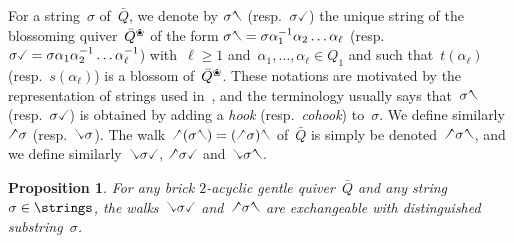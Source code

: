 \documentclass{amsart}
\newtheorem{proposition}[theorem]{Proposition}
\theoremstyle{definition}
\newcommand{\darkblue}{\color{darkblue}} %
\newcommand{\defn}[1]{\textsl{\darkblue #1}} %
\newcommand{\quiver}{\bar Q} %
\newcommand{\blossom}{^\text{\ding{96}}} %
\newcommand{\hL}{\text{\rotatebox[origin=c]{180}{\checked}}}
\newcommand{\hR}{\text{\rotatebox[origin=c]{180}{\reflectbox{\checked}}}}
\newcommand{\cL}{\text{\reflectbox{\checked}}}
\newcommand{\cR}{\text{\checked}}
\newcommand{\hh}[1]{\hL#1\hR} %
\newcommand{\cc}[1]{\cL#1\cR} %
\newcommand{\hc}[1]{\hL#1\cR} %
\newcommand{\ch}[1]{\cL#1\hR} %
\begin{document}
For a string~$\sigma$ of~$\quiver$, we denote by $\sigma\hR$ (resp.~$\sigma\cR$) the unique string of the blossoming quiver~$\quiver\blossom$ of the form $\sigma\hR = \sigma \alpha_1^{-1} \alpha_2 \dots \alpha_\ell$ (resp.~$\sigma\cR = \sigma \alpha_1 \alpha_2^{-1} \dots \alpha_\ell^{-1}$) with~$\ell \ge 1$ and~${\alpha_1, \dots, \alpha_\ell \in Q_1}$ and such that~$t(\alpha_\ell)$ (resp.~$s(\alpha_\ell)$) is a blossom of~$\quiver\blossom$.
These notations are motivated by the representation of strings used in~\cite{ButlerRingel, PaluPilaudPlamondon-nonkissing}, and the terminology usually says that~$\sigma\hR$ (resp.~$\sigma\cR$) is obtained by adding a \defn{hook} (resp.~\defn{cohook}) to~$\sigma$.
We define similarly~$\hL\sigma$ (resp.~$\cL\sigma$).
The walk~$\hL(\sigma\hR) = (\hL\sigma)\hR$ of~$\quiver$ is simply be denoted~$\hh{\sigma}$, and we define similarly~$\cc{\sigma}$, $\hc{\sigma}$ and~$\ch{\sigma}$.

\begin{proposition}
\label{prop:interestingExchangeablePairsNKC}
For any brick $2$-acyclic gentle quiver~$\quiver$ and any string~$\sigma \in \strings$, the walks~$\cc{\sigma}$ and~$\hh{\sigma}$ are exchangeable with distinguished substring~$\sigma$.
\end{proposition}
\end{document}
